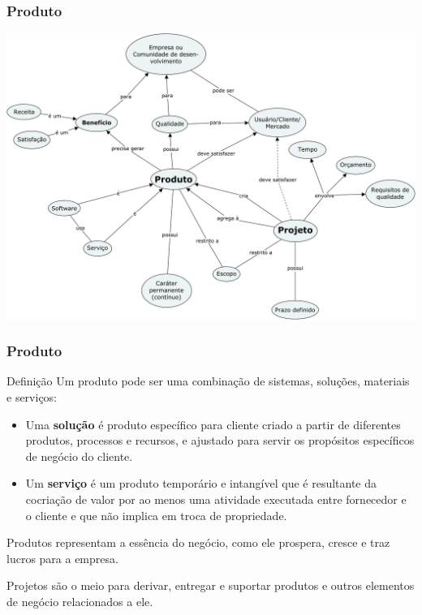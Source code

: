\begin{frame}[parent={ie:agenda}, hasnext=false, hasprev=false]
	\frametitle{Produto}

	\begin{center}
		\includegraphics[width=\textwidth]{product}
	\end{center}
\end{frame}


\begin{frame}[parent={ie:agenda}, hasnext=false, hasprev=false]
	\frametitle{Produto}
	
	\begin{block:concept}{Definição}
		Um produto pode ser uma combinação de sistemas, soluções, materiais
		e serviços:
	
		\begin{itemize}
			\item Uma \textbf{solução} é produto específico para cliente
			criado a partir de diferentes produtos, processos e recursos,
			e ajustado para servir os propósitos específicos
			de negócio do cliente.
			
			\item Um \textbf{serviço} é um produto temporário e intangível que é
			resultante da cocriação de valor por ao menos uma atividade
			executada entre fornecedor e o cliente e que não implica em
			troca de propriedade.
		\end{itemize}
	\end{block:concept}
		
	\begin{block:fact}{}
		Produtos representam a essência do negócio, como ele prospera,
		cresce e traz lucros para a empresa.
		
		Projetos são o meio para derivar, entregar e suportar produtos
		e outros elementos de negócio relacionados a ele.
	\end{block:fact}
\end{frame}



